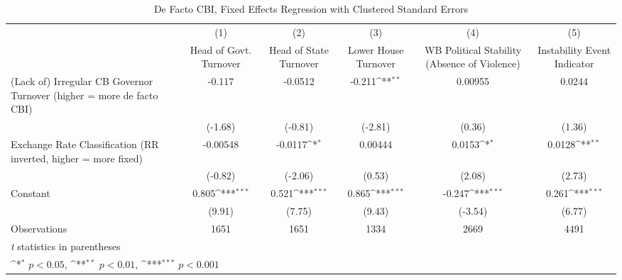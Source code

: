\begin{table}[htbp]\centering
\def\sym#1{\ifmmode^{#1}\else\(^{#1}\)\fi}
\caption{De Facto CBI, Fixed Effects Regression with Clustered Standard Errors \label{multIndFEDF}}
\begin{tabular*}{\linewidth}{@{\hskip\tabcolsep\extracolsep\fill}l*{5}{c}}
\toprule
                &\multicolumn{1}{c}{(1)}&\multicolumn{1}{c}{(2)}&\multicolumn{1}{c}{(3)}&\multicolumn{1}{c}{(4)}&\multicolumn{1}{c}{(5)}\\
                &\multicolumn{1}{c}{Head of Govt. Turnover}&\multicolumn{1}{c}{Head of State Turnover}&\multicolumn{1}{c}{Lower House Turnover}&\multicolumn{1}{c}{WB Political Stability (Absence of Violence)}&\multicolumn{1}{c}{Instability Event Indicator}\\
\midrule
(Lack of) Irregular CB Governor Turnover (higher = more de facto CBI)&   -0.117         &  -0.0512         &   -0.211\sym{**} &  0.00955         &   0.0244         \\
                &  (-1.68)         &  (-0.81)         &  (-2.81)         &   (0.36)         &   (1.36)         \\
\addlinespace
Exchange Rate Classification (RR inverted, higher = more fixed)& -0.00548         &  -0.0117\sym{*}  &  0.00444         &   0.0153\sym{*}  &   0.0128\sym{**} \\
                &  (-0.82)         &  (-2.06)         &   (0.53)         &   (2.08)         &   (2.73)         \\
\addlinespace
Constant        &    0.805\sym{***}&    0.521\sym{***}&    0.865\sym{***}&   -0.247\sym{***}&    0.261\sym{***}\\
                &   (9.91)         &   (7.75)         &   (9.43)         &  (-3.54)         &   (6.77)         \\
\midrule
Observations    &     1651         &     1651         &     1334         &     2669         &     4491         \\
\bottomrule
\multicolumn{6}{l}{\footnotesize \textit{t} statistics in parentheses}\\
\multicolumn{6}{l}{\footnotesize \sym{*} \(p<0.05\), \sym{**} \(p<0.01\), \sym{***} \(p<0.001\)}\\
\end{tabular*}
\end{table}
